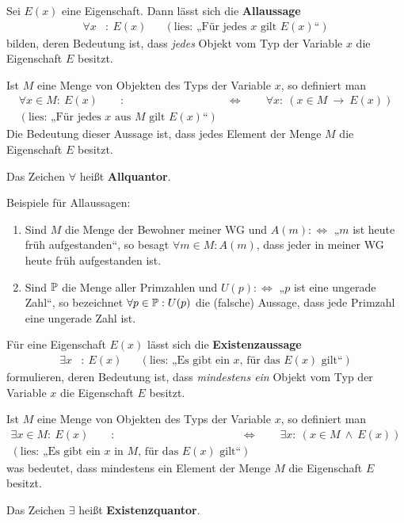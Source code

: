 \begin{de}[Allaussage] \label{def:allquant}
    Sei $E(x)$ eine Eigenschaft. Dann lässt sich die \textbf{Allaussage}
    \begin{align*}
        \forall x &:\  E(x) && (\text{lies: „Für jedes $x$ gilt $E(x)$“})
    \end{align*}
    bilden, deren Bedeutung ist, dass \emph{jedes} Objekt vom Typ der Variable $x$ die Eigenschaft $E$ besitzt.
    
    Ist $M$ eine Menge von Objekten des Typs der Variable $x$, so definiert man
    \begin{align*}
        \forall x\in M:\ E(x) \qquad :& \Leftrightarrow\qquad \forall x:\ (x\in M\ \to\ E(x))  \\
        (\text{lies: „Für jedes $x$ aus $M$ gilt $E(x)$“}) &
    \end{align*}
    Die Bedeutung dieser Aussage ist, dass jedes Element der Menge $M$ die Eigenschaft $E$ besitzt.
    
    Das Zeichen $\forall$ heißt \textbf{Allquantor}.
\end{de}


\begin{bsp}
    Beispiele für Allaussagen:
    \begin{enumerate}
        \item Sind $M$ die Menge der Bewohner meiner WG und $A(m):\Leftrightarrow$ „$m$ ist heute früh aufgestanden“, so besagt $\forall m\in M: A(m)$, dass jeder in meiner WG heute früh aufgestanden ist.
        \item Sind $\mathbb P$ die Menge aller Primzahlen und $U(p):\Leftrightarrow$ „$p$ ist eine ungerade Zahl“, so bezeichnet $\forall p\in\mathbb P : U(p)$ die (falsche) Aussage, dass jede Primzahl eine ungerade Zahl ist.
    \end{enumerate}
\end{bsp}


\begin{de}[Existenzaussage]\label{def:existquant}
    Für eine Eigenschaft $E(x)$ lässt sich die \textbf{Existenzaussage}
    \begin{align*}
        \exists x &:\ E(x) && (\text{lies: „Es gibt ein $x$, für das $E(x)$ gilt“})
    \end{align*}
    formulieren, deren Bedeutung ist, dass \emph{mindestens ein} Objekt vom Typ der Variable $x$ die Eigenschaft $E$ besitzt.
    
    Ist $M$ eine Menge von Objekten des Typs der Variable $x$, so definiert man
    \begin{align*}
        \exists x\in M:\ E(x) \qquad :& \Leftrightarrow\qquad \exists x:\ (x\in M\ \land\ E(x))  \\
        (\text{lies: „Es gibt ein $x$ in $M$, für das $E(x)$ gilt“}) &
    \end{align*}
    was bedeutet, dass mindestens ein Element der Menge $M$ die Eigenschaft $E$ besitzt.
    
    Das Zeichen $\exists$ heißt \textbf{Existenzquantor}.
\end{de}
    

